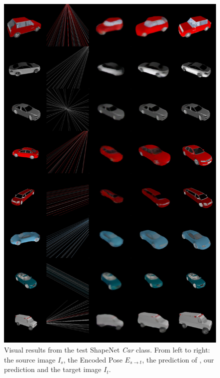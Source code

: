\begin{figure}[htp!]
    \begin{center}
    \includegraphics[width=.9\textwidth]{images/epipolarnvs/SuppMat_Car.jpg}
    \end{center}
     \caption{Visual results from the test ShapeNet \cite{Shapenet} \textit{Car} class. From left to right: the source image  $I_s$, the Encoded Pose $E_{s\xrightarrow{}t}$,  the prediction of \cite{NVS_skip}, our prediction and the target image $I_t$.}     \label{fig:add_visCar}
\end{figure}


